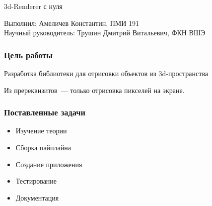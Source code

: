 \documentclass{beamer}
\title{}
\date{2021}
\author{Константин Амеличев}
\begin{document}
\begin{frame}
\begin{center}


{\large \scshape

\bigskip

\bigskip

3d-Renderer с нуля

\bigskip
\bigskip
\bigskip
\bigskip
\bigskip
\bigskip
}



Выполнил: Амеличев Константин, ПМИ 191\\
\bigskip
Научный руководитель: Трушин Дмитрий Витальевич, ФКН ВШЭ


\end{center}
\end{frame}

\begin{frame}

\frametitle{Цель работы}

Разработка библиотеки для отрисовки объектов из 3d-пространства

\bigskip

Из пререквизитов~--- только отрисовка пикселей на экране.

\end{frame}

\begin{frame}

\frametitle{Поставленные задачи}

\begin{itemize}
\item Изучение теории
\item Сборка пайплайна
\item Создание приложения
\item Тестирование
\item Документация
\end{itemize}

\end{frame}
\end{document}

